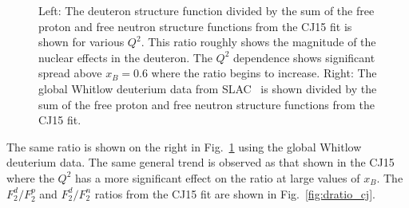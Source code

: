 \documentclass[oneside]{article}
\begin{document}
\begin{figure}
\begin{minipage}{0.5\textwidth}
 \end{minipage}
  \caption[]{Left: The deuteron structure function divided by the sum of the free proton and free neutron structure functions from the CJ15 fit is shown for various $Q^2$. This ratio roughly shows the magnitude of the nuclear effects in the deuteron. The $Q^2$ dependence shows significant spread above $x_B=0.6$ where the ratio begins to increase. Right: The global Whitlow deuterium data from SLAC~\cite{XS_d} is shown divided by the sum of the free proton and free neutron structure functions from the CJ15 fit.}
  \label{fig:dpn_cj}
\end{figure}  
 
The same ratio is shown on the right in Fig.~\ref{fig:dpn_cj} using the global Whitlow deuterium data. The same general trend is observed as that shown in the CJ15 where the $Q^2$ has a more significant effect on the ratio at large values of $x_B$. The $F_2^d/F_2^p$ and $F_2^d/F_2^n$ ratios from the CJ15 fit are shown in Fig.~\ref{fig:dratio_cj}. 
 
\end{document}
